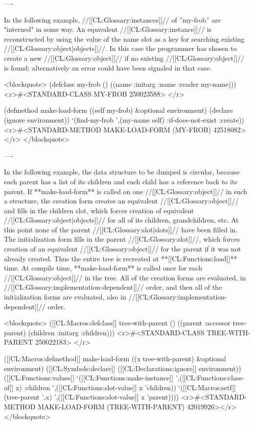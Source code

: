 ----

In the following example, //[[CL:Glossary:instances]]// of ''my-frob'' are "interned" in some way. An equivalent //[[CL:Glossary:instance]]// is reconstructed by using the value of the name slot as a key for searching existing //[[CL:Glossary:object|objects]]//. In this case the programmer has chosen to create a new //[[CL:Glossary:object]]// if no existing //[[CL:Glossary:object]]// is found; alternatively an error could have been signaled in that case.

<blockquote> 
(defclass my-frob () 
  ((name :initarg :name :reader my-name)))
<r>#<STANDARD-CLASS MY-FROB 250023588> </r>

(defmethod make-load-form ((self my-frob) &optional environment) 
  (declare (ignore environment)) 
  `(find-my-frob ',(my-name self) :if-does-not-exist :create))
<r>#<STANDARD-METHOD MAKE-LOAD-FORM (MY-FROB) 42518082></r>
</blockquote>

----

In the following example, the data structure to be dumped is circular, because each parent has a list of its children and each child has a reference back to its parent. If **make-load-form** is called on one //[[CL:Glossary:object]]// in such a structure, the creation form creates an equivalent //[[CL:Glossary:object]]// and fills in the children slot, which forces creation of equivalent //[[CL:Glossary:object|objects]]// for all of its children, grandchildren, etc. At this point none of the parent //[[CL:Glossary:slot|slots]]// have been filled in. The initialization form fills in the parent //[[CL:Glossary:slot]]//, which forces creation of an equivalent //[[CL:Glossary:object]]// for the parent if it was not already created. Thus the entire tree is recreated at **[[CL:Functions:load]]** time. At compile time, **make-load-form** is called once for each //[[CL:Glossary:object]]// in the tree. All of the creation forms are evaluated, in //[[CL:Glossary:implementation-dependent]]// order, and then all of the initialization forms are evaluated, also in //[[CL:Glossary:implementation-dependent]]// order.


<blockquote> 
([[CL:Macros:defclass]] tree-with-parent () 
  ((parent :accessor tree-parent) 
   (children :initarg :children)))
<r>#<STANDARD-CLASS TREE-WITH-PARENT 250022183> </r>

([[CL:Macros:defmethod]] make-load-form ((x tree-with-parent) &optional environment) 
  ([[CL:Symbols:declare]] ([[CL:Declarations:ignore]] environment)) 
  ([[CL:Functions:values]] 
     `([[CL:Functions:make-instance]] ',([[CL:Functions:class-of]] x) :children ',([[CL:Functions:slot-value]] x 'children))
     `([[CL:Macros:setf]] (tree-parent ',x) ',([[CL:Functions:slot-value]] x 'parent))))
<r>#<STANDARD-METHOD MAKE-LOAD-FORM (TREE-WITH-PARENT) 42019926></r>
</blockquote>

